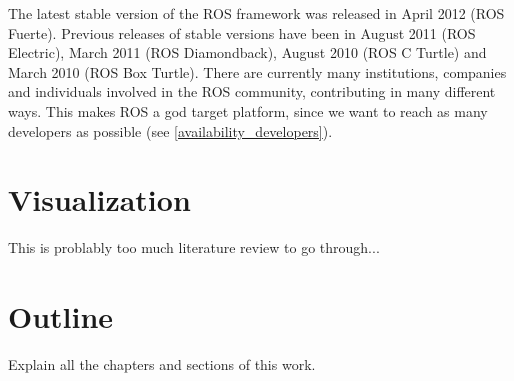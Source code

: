 The latest stable version of the ROS framework was released in April 2012 (ROS Fuerte). Previous releases of stable versions have been in August 2011 (ROS Electric), March 2011 (ROS Diamondback), August 2010 (ROS C Turtle) and March 2010 (ROS Box Turtle). There are currently many institutions, companies and individuals involved in the ROS community, contributing in many different ways. This makes ROS a god target platform, since we want to reach as many developers as possible (see \ref{availability_developers}).

\section{Visualization}
This is problably too much literature review to go through...

\section{Outline}
Explain all the chapters and sections of this work.
